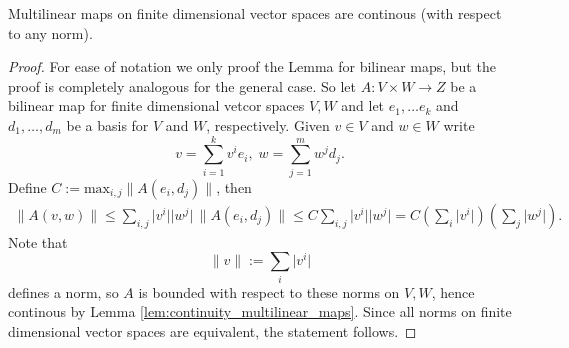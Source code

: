 \begin{lemma}
    Multilinear maps on finite dimensional vector spaces are continous (with respect to any norm).
\end{lemma}
\begin{proof}
    For ease of notation we only proof the Lemma for bilinear maps, but the proof is completely analogous for the general case. So let $A \colon V \times W \to Z$ be a bilinear map for finite dimensional vetcor spaces $V, W$ and let $e_1, \ldots e_k$ and $d_1,\ldots,d_m$ be a basis for $V$ and $W$, respectively. Given $v \in V$ and $w \in W$ write 
    \[
    v = \sum_{i = 1}^{k} v^i e_i, \; w = \sum_{j = 1}^{m} w^j d_j.
    \]
    Define $C := \mathrm{max}_{i,j} \lVert A(e_i,d_j) \rVert$, then
    \begin{align*}
        \lVert A(v,w) \rVert \leq \sum_{i,j} \lvert v^i \rvert \lvert w^j \rvert \, \lVert A(e_i,d_j) \rVert \leq C \sum_{i,j} \lvert v^i \rvert \lvert w^j \rvert = C \left(\sum_i \lvert v^i \rvert\right) \left(\sum_j \lvert w^j \rvert\right).
    \end{align*}
    Note that 
    \[
    \lVert v \rVert := \sum_i \lvert v^i \rvert
    \]
    defines a norm, so $A$ is bounded with respect to these norms on $V,W$, hence continous by Lemma \ref{lem:continuity_multilinear_maps}. Since all norms on finite dimensional vector spaces are equivalent, the statement follows.
\end{proof}